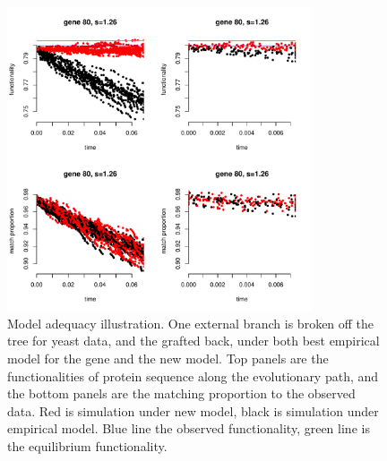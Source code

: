 \documentclass[12pt]{article}
\begin{document}
\begin{figure}[h]
\centering
\includegraphics[width=0.8\textwidth]{gene80_adequacy.pdf}
\caption{Model adequacy illustration. One external branch is broken off the tree for yeast data, and the grafted back, under both best empirical model for the gene and the new model. Top panels are the functionalities of protein sequence along the evolutionary path, and the bottom panels are the matching proportion to the observed data. Red is simulation under new model, black is simulation under empirical model. Blue line the observed functionality, green line is the equilibrium functionality.}
\label{fig:adequacy}
\end{figure}
\end{document}
